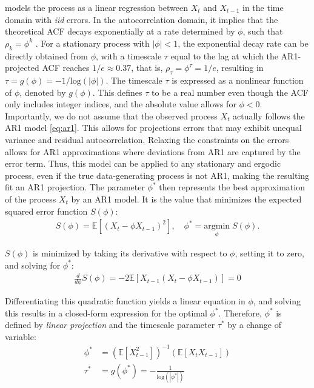 \documentclass[main.tex]{subfiles}
\begin{document}
\noindent models the process as a linear regression between $X_t$ and $X_{t-1}$ in the time domain with \textit{iid} errors. In the autocorrelation domain, it implies that the theoretical ACF decays exponentially at a rate determined by $\phi$, such that $\rho_k = \phi^k$ \citep[Chapter~14.22]{hansen_econometrics_2022}. For a stationary process with $|\phi|<1$, the exponential decay rate can be directly obtained from $\phi$, with a timescale $\tau$ equal to the lag at which the AR1-projected ACF reaches $1/e\approx 0.37$, that is,  $\rho_\tau = \phi^\tau = 1/e$, resulting in $\tau = g(\phi) = -1/\text{log}(|\phi|)$. The timescale $\tau$ is expressed as a nonlinear function of $\phi$, denoted by $g(\phi)$. This defines $\tau$ to be a real number even though the ACF only includes integer indices, and the absolute value allows for $\phi<0$.\\

Importantly, we do not assume that the observed process $X_t$ actually follows the AR1 model \eqref{eq:ar1}. This allows for projections errors that may exhibit unequal variance and residual autocorrelation. Relaxing the constraints on the errors allows for AR1 approximations where deviations from AR1 are captured by the error term. Thus, this model can be applied to any stationary and ergodic process, even if the true data-generating process is not AR1, making the resulting fit an AR1 projection. The parameter $\phi^*$ then represents the best approximation of the process $X_t$ by an AR1 model. It is the value that minimizes the expected squared error function $S(\phi)$:
\begin{align}
    S(\phi) = \mathbb{E}[(X_t - \phi X_{t-1})^2],\quad \phi^* = \underset{\phi}{\text{argmin}} \; S(\phi).
\end{align}

\noindent $S(\phi)$ is minimized by taking its derivative with respect to $\phi$, setting it to zero, and solving for $\phi^*$:
\begin{align}
    \frac{d}{d\phi} S(\phi) = -2 \mathbb{E}[X_{t-1}(X_t - \phi X_{t-1})] = 0
\end{align}

\noindent Differentiating this quadratic function yields a linear equation in $\phi$, and solving this results in a closed-form expression for the optimal $\phi^*$. Therefore, $\phi^*$ is defined by \textit{linear projection} and the timescale parameter $\tau^*$ by a change of variable:
\begin{align}
    \phi^* &= (\mathbb{E}[X_{t-1}^2])^{-1}(\mathbb{E}[X_t X_{t-1}]) \label{eq:ar1-phi}\\
    \tau^* &= g(\phi^*) = -\frac{1}{\text{log}(|\phi^*|)} \label{eq:ar1-tau}
\end{align}
\end{document}
